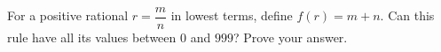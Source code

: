For a positive rational $r=\dfrac{m}{n}$ in lowest terms, define $f(r)=m+n$. Can this rule have all its values between $0$ and $999$? Prove your answer.
